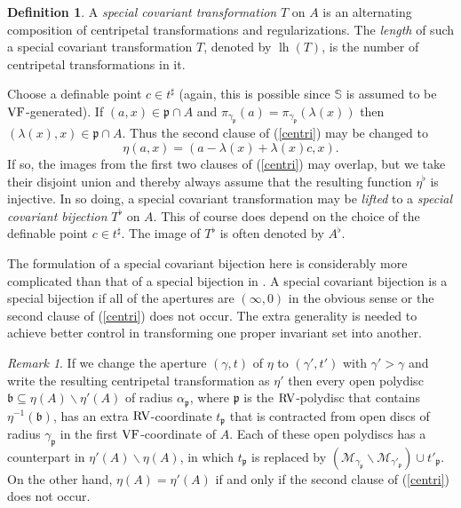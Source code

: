 \documentclass[12pt]{amsart}
\newcommand{\memph}[1]{{\color{magenta}\emph{#1}}}
\theoremstyle{plain}
\theoremstyle{definition}
\newtheorem{defn}[thm]{Definition}
\theoremstyle{remark}
\newtheorem{rem}[thm]{Remark}
\numberwithin{equation}{section}
\theoremstyle{plain}
\newcommand{\VF}{\textup{VF}}
\newcommand{\RV}{\textup{RV}}
\newcommand{\MM}{\mdl M}
\DeclareMathOperator{\lh}{lh}
\newcommand{\gb}{\mathfrak{b}}
\newcommand{\gp}{\mathfrak{p}}
\newcommand{\0}{\emptyset}
\newcommand{\mdl}[1]{\mathcal{#1}}  %
\newcommand{\sub}{\subseteq}
\newcommand{\mi}{\smallsetminus}
\begin{document}
\begin{defn}
A \memph{special covariant transformation} $T$ on $A$ is an alternating composition of centripetal transformations and regularizations. The \memph{length} of such a special covariant transformation $T$, denoted by $\lh(T)$, is the number of centripetal transformations in it.

Choose a definable point $c \in t^\sharp$ (again, this is possible since $\mathbb{S}$ is assumed to be $\VF$-generated). If $(a, x) \in \gp \cap A$ and $\pi_{\gamma_{\gp}}(a) = \pi_{\gamma_{\gp}}(\lambda(x))$  then $(\lambda(x), x) \in \gp \cap A$. Thus  the second clause of (\ref{centri}) may be changed to
\[
\eta (a, x) = (a - \lambda(x) + \lambda(x)c, x).
\]
If so, the images from the first two clauses of (\ref{centri}) may  overlap, but we take their disjoint union and thereby always assume that the resulting function $\eta^\flat$ is injective. In so doing, a special covariant transformation may be \memph{lifted} to a \memph{special covariant bijection} $T^\flat$ on $A$. This of course does depend on the choice of the definable point $c \in t^\sharp$.
The image of $T^\flat$ is often denoted by $A^{\flat}$.
\end{defn}

The formulation of a special covariant bijection here is considerably more complicated than  that of a special bijection in \cite[Definition~5.1]{Yin:special:trans}. A special covariant bijection is a special bijection if all of the apertures are $(\infty, 0)$ in the obvious sense or the second clause of (\ref{centri}) does not occur. The extra generality is needed to achieve better control in transforming one proper invariant set into another.

\begin{rem}\label{bigger:aper}
If we change the aperture $(\gamma, t)$ of $\eta$ to $(\gamma', t')$ with $\gamma' > \gamma$ and write the resulting  centripetal transformation as $\eta'$ then  every open polydisc $\gb \sub \eta(A) \mi \eta'(A)$ of radius $\alpha_\gp$, where $\gp$ is the $\RV$-polydisc that contains $\eta^{-1}(\gb)$, has an extra $\RV$-coordinate $t_\gp$ that is contracted from open discs of radius $\gamma_\gp$ in the first $\VF$-coordinate of $A$. Each of these open polydiscs has a counterpart in $\eta'(A) \mi \eta(A)$, in which $t_\gp$ is replaced by  $(\MM_{\gamma_\gp} \mi \MM_{\gamma'_\gp}) \cup t'_{\gp}$. On the other hand, $\eta(A) = \eta'(A)$ if and only if the second clause of (\ref{centri}) does not occur.
\end{rem}
\end{document}
